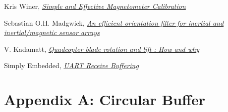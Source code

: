 \documentclass[a4paper,12pt,oneside]{book}
\begin{document}
\begin{thebibliography}{20}
Kris Winer, \href{https://github.com/kriswiner/MPU6050/wiki/Simple-and-Effective-Magnetometer-Calibration}{\textit{Simple and Effective Magnetometer Calibration}}

Sebastian O.H. Madgwick, \href{./datasheets/Madgwick Internal Report.pdf}{\textit{An efficient orientation filter for inertial and inertial/magnetic sensor arrays}}

V. Kadamatt, \href{http://www.droneybee.com/quadcopter-blade-rotation-lift/}{\textit{Quadcopter blade rotation and lift : How and why}}

Simply Embedded, \href{http://www.simplyembedded.org/tutorials/interrupt-free-ring-buffer/}{\textit{UART Receive Buffering}}


\end{thebibliography}


\chapter*[]{Appendix A: Circular Buffer}
\end{document}
